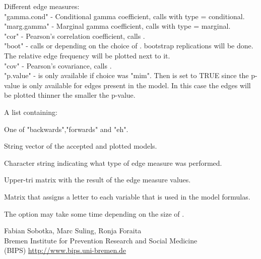 \begin{Details}\relax
Different edge measures:\\
"gamma.cond" - Conditional gamma coefficient, calls  with type = conditional.\\
"marg.gamma" - Marginal gamma coefficient, calls  with type = marginal.\\
"cor" - Pearson's correlation coefficient, calls .\\
"boot" - calls  or  depending on the choice of .  bootstrap replications will be done. The relative edge frequency will be plotted next to it.\\
"cov" - Pearson's covariance, calls . \\
"p.value" - is only available if  choice was "mim". Then  is set to TRUE since the p-value is only available for edges present in the model. In this case the edges will be plotted thinner the smaller the p-value.
\end{Details}
\begin{Value}
A list containing:
\begin{ldescription}
\item[\code{"strategy"}] One of "backwards","forwards" and "eh". 
\item[\code{"model" }] String vector of the accepted and plotted models. 
\item[\code{"edge.measure" }] Character string indicating what type of edge measure was performed. 
\item[\code{"analysis"}] Upper-tri matrix with the result of the edge measure values. 
\item[\code{"variable names"}] Matrix that assigns a letter to each variable that is used in the model formulas. 
\end{ldescription}
\end{Value}
\begin{Note}\relax
The option  may take some time depending on the size of .
\end{Note}
\begin{Author}\relax
Fabian Sobotka, Marc Suling, Ronja Foraita \\
Bremen Institute for Prevention Research and Social Medicine \\
(BIPS)  \url{http://www.bips.uni-bremen.de}
\end{Author}
